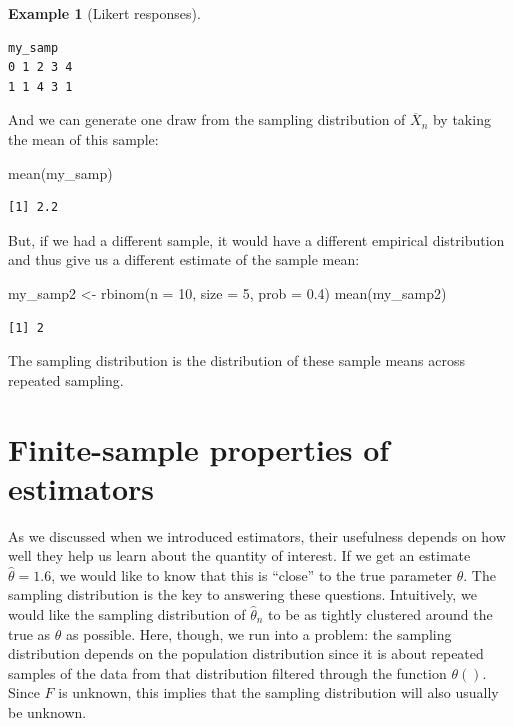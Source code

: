\documentclass[
  letterpaper,
  DIV=11,
  numbers=noendperiod]{scrreprt}
\newenvironment{Shaded}{\begin{snugshade}}{\end{snugshade}}
\newcommand{\AttributeTok}[1]{\textcolor[rgb]{0.40,0.45,0.13}{#1}}
\newcommand{\DecValTok}[1]{\textcolor[rgb]{0.68,0.00,0.00}{#1}}
\newcommand{\FloatTok}[1]{\textcolor[rgb]{0.68,0.00,0.00}{#1}}
\newcommand{\FunctionTok}[1]{\textcolor[rgb]{0.28,0.35,0.67}{#1}}
\newcommand{\NormalTok}[1]{\textcolor[rgb]{0.00,0.23,0.31}{#1}}
\newcommand{\OtherTok}[1]{\textcolor[rgb]{0.00,0.23,0.31}{#1}}
\newcommand{\Xbar}{\overline{X}}
\theoremstyle{definition}
\newtheorem{example}{Example}[chapter]
\theoremstyle{definition}
\theoremstyle{plain}
\theoremstyle{remark}
\begin{document}
\begin{example}[Likert
responses]
\begin{verbatim}
my_samp
0 1 2 3 4 
1 1 4 3 1 
\end{verbatim}

And we can generate one draw from the sampling distribution of
\(\Xbar_n\) by taking the mean of this sample:

\begin{Shaded}
\begin{Highlighting}[]
\FunctionTok{mean}\NormalTok{(my\_samp)}
\end{Highlighting}
\end{Shaded}

\begin{verbatim}
[1] 2.2
\end{verbatim}

But, if we had a different sample, it would have a different empirical
distribution and thus give us a different estimate of the sample mean:

\begin{Shaded}
\begin{Highlighting}[]
\NormalTok{my\_samp2 }\OtherTok{\textless{}{-}} \FunctionTok{rbinom}\NormalTok{(}\AttributeTok{n =} \DecValTok{10}\NormalTok{, }\AttributeTok{size =} \DecValTok{5}\NormalTok{, }\AttributeTok{prob =} \FloatTok{0.4}\NormalTok{)}
\FunctionTok{mean}\NormalTok{(my\_samp2) }
\end{Highlighting}
\end{Shaded}

\begin{verbatim}
[1] 2
\end{verbatim}

The sampling distribution is the distribution of these sample means
across repeated sampling.

\end{example}

\hypertarget{finite-sample-properties-of-estimators}{%
\section{Finite-sample properties of
estimators}\label{finite-sample-properties-of-estimators}}

As we discussed when we introduced estimators, their usefulness depends
on how well they help us learn about the quantity of interest. If we get
an estimate \(\widehat{\theta} = 1.6\), we would like to know that this
is ``close'' to the true parameter \(\theta\). The sampling distribution
is the key to answering these questions. Intuitively, we would like the
sampling distribution of \(\widehat{\theta}_n\) to be as tightly
clustered around the true as \(\theta\) as possible. Here, though, we
run into a problem: the sampling distribution depends on the population
distribution since it is about repeated samples of the data from that
distribution filtered through the function \(\theta()\). Since \(F\) is
unknown, this implies that the sampling distribution will also usually
be unknown.
\end{document}
